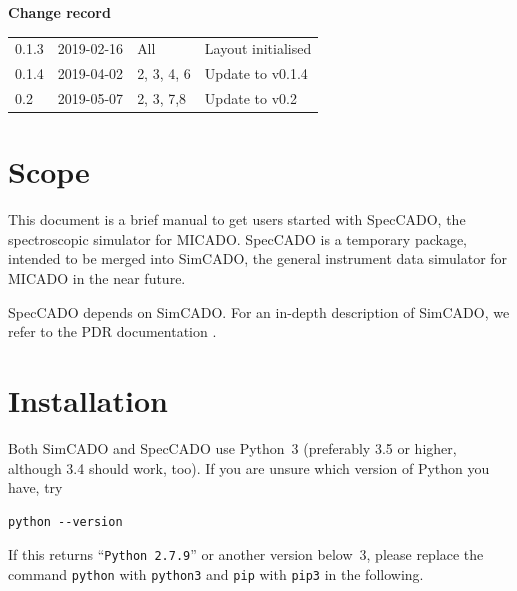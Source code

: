\documentclass[a4paper,twoside,11pt]{article}
\begin{document}
\lstset{basicstyle=\ttfamily}
\dmdmaketitle


\begin{center}
  \textbf{Change record}

  \tabletail{\hline}

  \begin{supertabular}{|l|l|l|l|}
   0.1.3 & 2019-02-16 & All & Layout initialised \\
   0.1.4 & 2019-04-02 & 2, 3, 4, 6 & Update to v0.1.4 \\
   0.2   & 2019-05-07 & 2, 3, 7,8  & Update to v0.2 \\
   \hline
  \end{supertabular}

\end{center}


\setcounter{tocdepth}{2}
\tableofcontents
\cleardoublepage


\section{Scope}
\label{sec:scope}

This document is a brief manual to get users started with SpecCADO,
the spectroscopic simulator for MICADO. SpecCADO is a temporary
package, intended to be merged into SimCADO, the general instrument
data simulator for MICADO in the near future.

SpecCADO depends on SimCADO. For an in-depth description of SimCADO,
we refer to the PDR documentation \cite{SimCADO-PDR}.

\section{Installation}
\label{sec:installation}

Both SimCADO and SpecCADO use Python~3 (preferably 3.5 or higher,
although 3.4 should work, too). If you are unsure which version of
Python you have, try
\begin{lstlisting}[style=csh]
python --version
\end{lstlisting}
If this returns ``\lstinline{Python 2.7.9}'' or another version
below~3, please replace the command \lstinline{python} with
\lstinline{python3} and \lstinline{pip} with \lstinline{pip3} in the
following.
\end{document}
